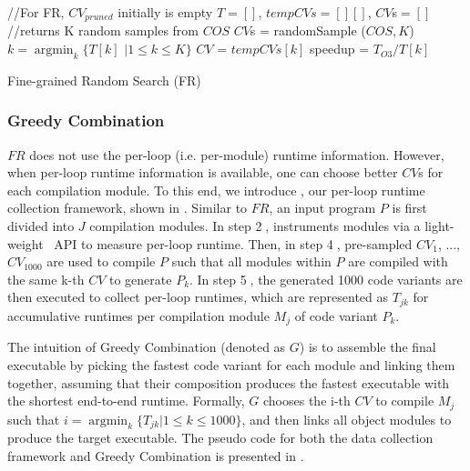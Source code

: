 \begin{algorithm}
\DontPrintSemicolon
\SetAlgoLined
{}
//For FR, $CV_{pruned}$ initially is empty\;
\BlankLine
$T= [ ]$, $tempCVs=[][]$, $CV$s$ = []$ \;
//returns K random samples from $COS$\;
$CV$s = randomSample ($COS, K$)\;
$k = \operatorname*{argmin}_k {\{T[k]}$ ${ | 1\leq{k}\leq{K}\}}$ \;
$CV$ = $tempCVs[k]$\;
speedup = $T_{O3}/T[k]$ \;
\caption{Fine-grained Random Search (FR)}
\label{alg:fr}

\end{algorithm}

\subsubsection{Greedy Combination}

$FR$ does not use the per-loop (i.e. per-module) runtime information.
However, when per-loop runtime information is available, one can
choose better $CV$s for each compilation module.  To this end, we
introduce \toolname, our per-loop runtime collection framework, shown
in .  Similar to $FR$, an input program $P$ is first
divided into $J$ compilation modules.  In step \textcircled{2},
\toolname instruments modules via a light-weight~\cite{caliper} API to
measure per-loop runtime.  Then, in step \textcircled{4}, pre-sampled
$CV_1$, ..., $CV_{1000}$ are used to compile $P$ such that all modules
within $P$ are compiled with the same k-th $CV$ to generate $P_k$.  In
step \textcircled{5}, the generated 1000 code variants are then
executed to collect per-loop runtimes, which are represented as
$T_{jk}$ for accumulative runtimes per compilation module $M_j$ of
code variant $P_k$.

The intuition of Greedy Combination (denoted as $G$) is to assemble
the final executable by picking the fastest code variant for each module
and linking them together, assuming that their composition produces
the fastest executable with the shortest end-to-end runtime.  Formally,
$G$ chooses the i-th $CV$ to compile $M_j$ such that
$i = \operatorname*{argmin}_k {\{T_{jk} | 1\leq{k}\leq{1000}\}}$, and
then links all object modules to produce the target executable.  The
pseudo code for both the \toolname data collection framework and
Greedy Combination is presented in .

